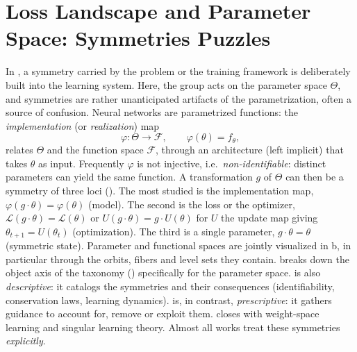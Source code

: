 \documentclass[mathematics,review,submit,moreauthors]{Definitions/mdpi}
\begin{document}
\section{Loss Landscape and Parameter Space: Symmetries Puzzles}\label{sec:parameter-space-symmetries}
In , a symmetry carried by the problem or the training framework is deliberately built into the learning system.
Here, the group acts on the parameter space $\Theta$, and symmetries are rather unanticipated artifacts of the parametrization, often a source of confusion.
Neural networks are parametrized functions: the \emph{implementation} (or \emph{realization}) map
\begin{equation}\label{eq:implementation-map}
    \varphi:\Theta\to\mathcal{F}, \qquad \varphi(\theta)=f_\theta,
\end{equation}
relates $\Theta$ and the function space $\mathcal F$, through an architecture (left implicit) that takes $\theta$ as input.
Frequently $\varphi$ is not injective, i.e.\ \emph{non-identifiable}: distinct parameters can yield the same function.
A transformation $g$ of $\Theta$ can then be a symmetry of three loci ().
The most studied is the implementation map, $\varphi(g\cdot\theta)=\varphi(\theta)$ (model).
The second is the loss or the optimizer, $\mathcal L(g\cdot\theta)=\mathcal L(\theta)$ or $U(g\cdot\theta)=g\cdot U(\theta)$ for $U$ the update map giving $\theta_{t+1}=U(\theta_t)$ (optimization).
The third is a single parameter, $g\cdot\theta=\theta$ (symmetric state).
Parameter and functional spaces are jointly visualized in  b, in particular through the orbits, fibers and level sets they contain.
 breaks down the object axis of the taxonomy () specifically for the parameter space.
 is also \emph{descriptive}: it catalogs the symmetries and their consequences (identifiability, conservation laws, learning dynamics).
 is, in contrast, \emph{prescriptive}: it gathers guidance to account for, remove or exploit them.
 closes with weight-space learning and singular learning theory.
Almost all works treat these symmetries \emph{explicitly}.
\end{document}
